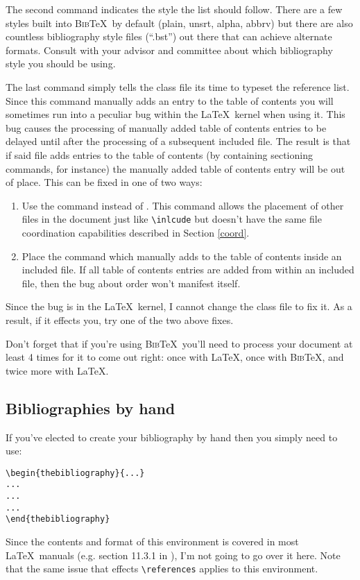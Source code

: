 The second command indicates the style the list should follow.  There are a few styles built into \textsc{Bib}\TeX\ by default (plain, unsrt, alpha, abbrv) but there are also countless bibliography style files (``.bst'') out there that can achieve alternate formats.  Consult with your advisor and committee about which bibliography style you should be using.

The last command simply tells the class file its time to typeset the reference list.  Since this command manually adds an entry to the table of contents you will sometimes run into a peculiar bug within the \LaTeX\ kernel when using it.  This bug causes the processing of manually added table of contents entries to be delayed until after the processing of a subsequent included file.  The result is that if said file adds entries to the table of contents (by containing sectioning commands, for instance) the manually added table of contents entry will be out of place.  This can be fixed in one of two ways:
\begin{enumerate}
\item{Use the \verb== command instead of \verb==.  This command allows the placement of other files in the document just like \verb=\inlcude= but doesn't have the same file coordination capabilities described in Section \ref{coord}.}
\item{Place the command which manually adds to the table of contents inside an included file.  If all table of contents entries are added from within an included file, then the bug about order won't manifest itself.}
\end{enumerate}
Since the bug is in the \LaTeX\ kernel, I cannot change the class file to fix it.  As a result, if it effects you, try one of the two above fixes.

Don't forget that if you're using \textsc{Bib}\TeX\ you'll need to process your document at least 4 times for it to come out right: once with \LaTeX, once with \textsc{Bib}\TeX, and twice more with \LaTeX.

\subsection{Bibliographies by hand}
If you've elected to create your bibliography by hand then you simply need to use:
\begin{verbatim}
\begin{thebibliography}{...}
...
...
...
\end{thebibliography}
\end{verbatim}
Since the contents and format of this environment is covered in most \LaTeX\ manuals (e.g. section 11.3.1 in \cite{Kopka:2004}), I'm not going to go over it here.  Note that the same issue that effects \verb=\references= applies to this environment.

